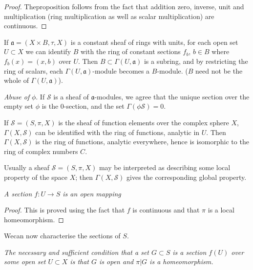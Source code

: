 \begin{proof}
The\pageoriginale proposition follows from the fact that addition
zero, inverse, 
unit and multiplication (ring multiplication as well as scalar
multiplication) are continuous. 
\end{proof}

\begin{remark*}
If $\mathfrak{a} = (X \times B, \tau ,X)$ is a constant sheaf of rings with
units, for each open set $U \subset X$ we can identify $B$ with the
ring of constant sections $f_b$, $b \in B$ where $f_b(x)=(x,b)$ over
$U$. Then $B \subset \Gamma (U, \mathfrak{a})$ is a subring, and by
restricting the ring of scalars, each $\Gamma (U,\mathfrak{a})$-module
becomes a  $B$-module. ($B$ need not be the whole of $\Gamma (U,
\mathfrak{a})$).   
\end{remark*}

\textit{Abuse of} $\phi$. If $\mathscr{S}$ is a sheaf of
$\mathfrak{a}$-modules, we agree that the unique section over the
empty set $\phi$ is the 0-section, and the set
$\Gamma(\phi\mathscr{S})=0 $.  


\setcounter{exam}{5}
\begin{exam}%
If $\mathscr{S}=(S, \pi , X)$ is the sheaf of function elements over
the complex sphere $X$, $\Gamma(X, \mathscr{S})$ can be identified with
the ring of functions, analytic in $U$. Then $\Gamma (X, \mathscr{S})$
is the ring of functions, analytic everywhere, hence is isomorphic to
the ring of complex numbers $C$.  
\end{exam}

\begin{note*}
Usually a sheaf $\mathscr{S}=(S, \pi , X)$ may be
interpreted as describing some local property of the space $X$; then
$\Gamma(X, \mathscr{S})$ gives the corresponding global property. 
\end{note*}

\textit{A section $f: U \to S$ is an open mapping}

\begin{proof}
This is proved using the fact that $f$ is continuous and that $\pi$ is
a local homeomorphism. 
\end{proof}

We\pageoriginale can now characterise the sections of $S$.

\textit{The necessary and sufficient condition that a set $G \subset
  S$ is a section $f(U)$ over some open set $U \subset X$ is that $G$
  is open and $\pi |G$ is a homeomorphism.} 

